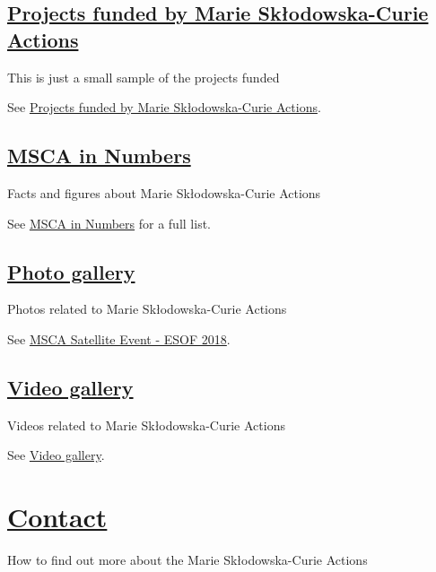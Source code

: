 \documentclass[oneside]{book}
\numberwithin{equation}{section}
\begin{document}
\subsection{\href{https://ec.europa.eu/research/mariecurieactions/funded-projects_en}{Projects funded by Marie Skłodowska-Curie Actions}}
\begin{center}
    This is just a small sample of the projects funded
\end{center}
See \href{https://ec.europa.eu/research/mariecurieactions/funded-projects_en}{Projects funded by Marie Skłodowska-Curie Actions}.

\subsection{\href{https://ec.europa.eu/research/mariecurieactions/msca-numbers_en}{MSCA in Numbers}}
\begin{center}
    Facts and figures about Marie Skłodowska-Curie Actions
\end{center}
See \href{https://ec.europa.eu/research/mariecurieactions/msca-numbers_en}{MSCA in Numbers} for a full list.

\subsection{\href{https://ec.europa.eu/research/mariecurieactions/resources/photos_en}{Photo gallery}}
\begin{center}
    Photos related to Marie Skłodowska-Curie Actions
\end{center}
See \href{https://ec.europa.eu/research/mariecurieactions/resources/photos/msca-satellite-event_en}{MSCA Satellite Event - ESOF 2018}. 

\subsection{\href{https://ec.europa.eu/research/mariecurieactions/resources/videos_en}{Video gallery}}
\begin{center}
    Videos related to Marie Skłodowska-Curie Actions
\end{center}
See \href{https://ec.europa.eu/research/mariecurieactions/resources/videos_en}{Video gallery}.

\section{\href{https://ec.europa.eu/research/mariecurieactions/contact_en}{Contact}}
\begin{center}
    How to find out more about the Marie Skłodowska-Curie Actions
\end{center}
\end{document}
